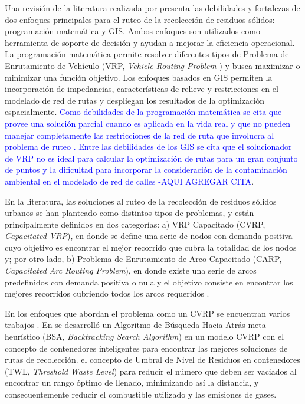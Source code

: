 \documentclass[conference,compsoc]{IEEEtran}
\begin{document}
Una revisión de la literatura realizada por \cite{Sulemana2018OptimalMethods} presenta las debilidades y fortalezas de dos enfoques principales para el ruteo de la recolección de residuos sólidos: programación matemática y GIS. Ambos enfoques son utilizados como herramienta de soporte de decisión y ayudan a mejorar la eficiencia operacional. La programación matemática permite resolver diferentes tipos de Problema de Enrutamiento de Vehículo (VRP, \textit{Vehicle Routing Problem} \cite{Tirkolaee2018ATime}) y busca maximizar o minimizar una función objetivo. Los enfoques basados en GIS permiten la incorporación de impedancias, características de relieve y restricciones en el modelado de red de rutas y despliegan los resultados de la optimización espacialmente. \textcolor{blue}{Como debilidades de la programación matemática se cita que provee una solución parcial cuando es aplicada en la vida real y que no pueden manejar completamente las restricciones de la red de ruta que involucra al problema de ruteo . Entre las debilidades de los GIS se cita que el solucionador de VRP no es ideal para calcular la optimización de rutas para un gran conjunto de puntos y la dificultad para incorporar la consideración de la contaminación ambiental en el modelado de red de calles -AQUI AGREGAR CITA}.

En la literatura, las soluciones al ruteo de la recolección de residuos sólidos urbanos se han planteado como distintos tipos de problemas, y están principalmente definidos en dos categorías: a) VRP Capacitado (CVRP, \textit{Capacitated VRP}), en donde se define una serie de nodos con demanda positiva cuyo objetivo es encontrar el mejor recorrido que cubra la totalidad de los nodos y; por otro lado, b) Problema de Enrutamiento de Arco Capacitado (CARP, \textit{Capacitated Arc Routing Problem}), en donde existe una serie de arcos predefinidos con demanda positiva o nula y el objetivo consiste en encontrar los mejores recorridos cubriendo todos los arcos requeridos \cite{Tirkolaee2018ATime}.

En los enfoques que abordan el problema como un CVRP se encuentran varios trabajos \cite{Akhtar2017BacktrackingOptimization,Ombuki-Berman2007WASTEALGORITHMS,Kim2006WasteWindows,Billa2014GISOptimization,Karadimas2007OptimalAlgorithm}. En \cite{Akhtar2017BacktrackingOptimization} se desarrolló un Algoritmo de Búsqueda Hacia Atrás meta-heurístico (BSA, \textit{Backtracking Search Algorithm}) en un modelo CVRP con el concepto de contenedores inteligentes para encontrar las mejores soluciones de rutas de recolección.  el concepto de Umbral de Nivel de Residuos en contenedores (TWL, \textit{Threshold Waste Level}) para reducir el número que deben ser vaciados al encontrar un rango óptimo de llenado, minimizando así la distancia, y consecuentemente reducir el combustible utilizado y las emisiones de gases.
\end{document}
